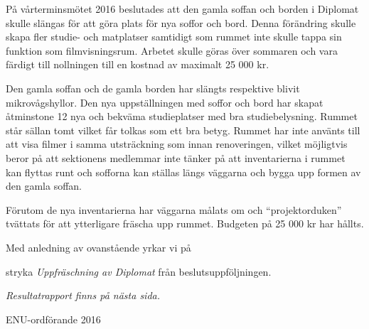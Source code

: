 \documentclass[../_main/handlingar.tex]{subfiles}
\begin{document}

På vårterminsmötet 2016 beslutades att den gamla soffan och borden i Diplomat skulle slängas för att göra plats för nya soffor och bord. Denna förändring skulle skapa fler studie- och matplatser samtidigt som rummet inte skulle tappa sin funktion som filmvisningsrum. Arbetet skulle göras över sommaren och vara färdigt till nollningen till en kostnad av maximalt 25 000 kr.

Den gamla soffan och de gamla borden har slängts respektive blivit mikrovågshyllor. Den nya uppställningen med soffor och bord har skapat åtminstone 12 nya och bekväma studieplatser med bra studiebelysning. Rummet står sällan tomt vilket får tolkas som ett bra betyg. Rummet har inte använts till att visa filmer i samma utsträckning som innan renoveringen, vilket möjligtvis beror på att sektionens medlemmar inte tänker på att inventarierna i rummet kan flyttas runt och sofforna kan ställas längs väggarna och bygga upp formen av den gamla soffan.

Förutom de nya inventarierna har väggarna målats om och “projektorduken” tvättats för att ytterligare fräscha upp rummet. Budgeten på 25 000 kr har hållts.

Med anledning av ovanstående yrkar vi på

\begin{attsatser}
    \att stryka \emph{Uppfräschning av Diplomat} från beslutsuppföljningen.
\end{attsatser}

\emph{Resultatrapport finns på nästa sida.}

\begin{signatures}{1}
    \ist
    \signature{Johannes Koch}{ENU-ordförande 2016}
\end{signatures}

\newpage

\end{document}
